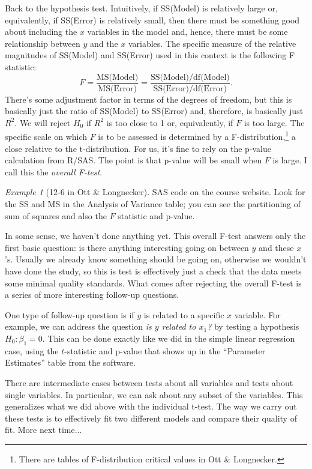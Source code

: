 \documentclass[a4paper, 12pt]{article}
\theoremstyle{plain}
\theoremstyle{definition}
\theoremstyle{remark}
\newtheorem*{example}{Example}
\begin{document}
Back to the hypothesis test.  Intuitively, if SS(Model) is relatively large or, equivalently, if SS(Error) is relatively small, then there must be something good about including the $x$ variables in the model and, hence, there must be some relationship between $y$ and the $x$ variables.  The specific measure of the relative magnitudes of SS(Model) and SS(Error) used in this context is the following F statistic:
\[ F = \frac{\text{MS(Model)}}{\text{MS(Error)}} = \frac{\text{SS(Model)} / \text{df(Model)}}{\text{SS(Error)} / \text{df(Error)}}. \]
There's some adjustment factor in terms of the degrees of freedom, but this is basically just the ratio of SS(Model) to SS(Error) and, therefore, is basically just $R^2$.  We will reject $H_0$ if $R^2$ is too close to 1 or, equivalently, if $F$ is too large.  The specific scale on which $F$ is to be assessed is determined by a F-distribution,\footnote{There are tables of F-distribution critical values in Ott \& Longnecker.} a close relative to the t-distribution.  For us, it's fine to rely on the p-value calculation from R/SAS.  The point is that p-value will be small when $F$ is large.  I call this the {\em overall F-test}.  

\begin{example}[12-6 in Ott \& Longnecker]
SAS code on the course website.  Look for the SS and MS in the Analysis of Variance table; you can see the partitioning of sum of squares and also the $F$ statistic and p-value. 
\end{example}

In some sense, we haven't done anything yet.  This overall F-test answers only the first basic question: is there anything interesting going on between $y$ and these $x$'s.  Usually we already know something should be going on, otherwise we wouldn't have done the study, so this is test is effectively just a check that the data meets some minimal quality standards.  What comes after rejecting the overall F-test is a series of more interesting follow-up questions.  

One type of follow-up question is if $y$ is related to a specific $x$ variable.  For example, we can address the question {\em is $y$ related to $x_1$?} by testing a hypothesis $H_0: \beta_1 = 0$.  This can be done exactly like we did in the simple linear regression case, using the $t$-statistic and p-value that shows up in the ``Parameter Estimates'' table from the software.  

There are intermediate cases between tests about all variables and tests about single variables.  In particular, we can ask about any subset of the variables.  This generalizes what we did above with the individual t-test.  The way we carry out these tests is to effectively fit two different models and compare their quality of fit.  More next time...
\end{document}
